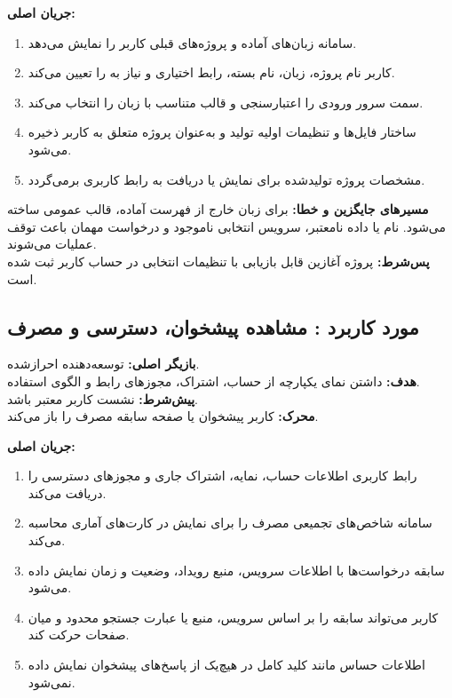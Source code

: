 
\noindent\textbf{جریان اصلی:}
\begin{enumerate}
  \item سامانه زبان‌های آماده و پروژه‌های قبلی کاربر را نمایش می‌دهد.
  \item کاربر نام پروژه، زبان، نام بسته، رابط اختیاری و نیاز به  را تعیین می‌کند.
  \item سمت سرور ورودی را اعتبارسنجی و قالب متناسب با زبان را انتخاب می‌کند.
  \item ساختار فایل‌ها و تنظیمات اولیه تولید و به‌عنوان پروژه متعلق به کاربر ذخیره می‌شود.
  \item مشخصات پروژه تولیدشده برای نمایش یا دریافت به رابط کاربری برمی‌گردد.
\end{enumerate}

\noindent\textbf{مسیرهای جایگزین و خطا:}
برای زبان خارج از فهرست آماده، قالب عمومی ساخته می‌شود. نام یا داده نامعتبر، سرویس انتخابی ناموجود و درخواست مهمان باعث توقف عملیات می‌شوند.\\
\textbf{پس‌شرط:} پروژه آغازین قابل بازیابی با تنظیمات انتخابی در حساب کاربر ثبت شده است.

\UseCaseStart
\subsection{مورد کاربرد : مشاهده پیشخوان، دسترسی و مصرف}
\noindent\textbf{بازیگر اصلی:} توسعه‌دهنده احرازشده.\\
\textbf{هدف:} داشتن نمای یکپارچه از حساب، اشتراک، مجوزهای رابط و الگوی استفاده.\\
\textbf{پیش‌شرط:} نشست کاربر معتبر باشد.\\
\textbf{محرک:} کاربر پیشخوان یا صفحه سابقه مصرف را باز می‌کند.


\noindent\textbf{جریان اصلی:}
\begin{enumerate}
  \item رابط کاربری اطلاعات حساب، نمایه، اشتراک جاری و مجوزهای دسترسی را دریافت می‌کند.
  \item سامانه شاخص‌های تجمیعی مصرف را برای نمایش در کارت‌های آماری محاسبه می‌کند.
  \item سابقه درخواست‌ها با اطلاعات سرویس، منبع رویداد، وضعیت و زمان نمایش داده می‌شود.
  \item کاربر می‌تواند سابقه را بر اساس سرویس، منبع یا عبارت جستجو محدود و میان صفحات حرکت کند.
  \item اطلاعات حساس مانند کلید کامل در هیچ‌یک از پاسخ‌های پیشخوان نمایش داده نمی‌شود.
\end{enumerate}

